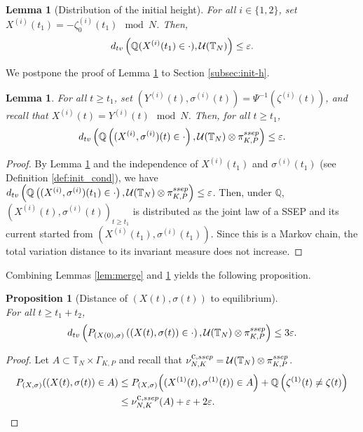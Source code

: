\documentclass[11pt,a4paper]{article}
\newcommand{\T}{\mathbb{T}}
\newcommand{\bP}{\textbf{P}}
\newcommand{\Q}{\mathbb{Q}}
\newcommand{\SSEP}{\textsc{ssep}}
\newtheorem{lemma}[theorem]{Lemma}
\newtheorem{proposition}[theorem]{Proposition}
\newcommand{\eqs}[1]{\begin{equation}#1\end{equation}}
\newcommand{\eq}[2]{\begin{equation}\label{#1}#2\end{equation}}
\begin{document}
\begin{lemma}[Distribution of the initial height] \label{lem:init_height}
For all $i \in \{1,2\}$, set $X^{(i)}(t_1) = -\zeta^{(i)}_0(t_1) \mod N$. Then,
\eq{eq:dtv_init_h}{d_{\textsc{tv}}\left(\Q(X^{(i)}(t_1) \in \cdot), \mathcal{U}(\T_N)\right) \le \varepsilon.}
\end{lemma}
We postpone the proof of Lemma \ref{lem:init_height} to Section \ref{subsec:init-h}. 

\begin{lemma} \label{lem:lawt1}
For all $t \ge t_1$, set $(Y^{(i)}(t),\sigma^{(i)}(t) ) = \Psi^{-1}\left(\zeta^{(i)}(t)\right)$, and recall that $X^{(i)}(t) = Y^{(i)}(t) \mod N$. Then, for all $t \ge t_1$,
\eqs{d_{\textsc{tv}}\left(\Q\left((X^{(i)}, \sigma^{(i)})(t) \in \cdot \right), \mathcal{U}(\T_N) \otimes \pi^{\SSEP}_{K,P}\right) \le \varepsilon.}
\end{lemma}
\begin{proof}
By Lemma \ref{lem:init_height} and the independence of $X^{(i)}(t_1)$ and $\sigma^{(i)}(t_1)$ (see Definition \ref{def:init_cond}), we have $d_{\textsc{tv}}\left(\Q\left((X^{(i)}, \sigma^{(i)})(t_1) \in \cdot\right), \mathcal{U}(\T_N) \otimes \pi_{K,P}^{\SSEP}\right) \le \varepsilon$. 
Then, under $\Q$, $(X^{(i)}(t), \sigma^{(i)}(t))_{t \ge t_1}$ is distributed as the joint law of a SSEP and its current started from $(X^{(i)}(t_1), \sigma^{(i)}(t_1))$. Since this is a Markov chain, the total variation distance to its invariant measure does not increase. 
\end{proof}

Combining Lemmas \ref{lem:merge} and \ref{lem:lawt1} yields the following proposition.
\begin{proposition}[Distance of $(X(t), \sigma(t))$ to equilibrium] \hspace{1cm}\\ For all $t\ge t_1 + t_2$, 
\eqs{d_{\textsc{tv}}\left(\textnormal{\bP}_{(X(0),\sigma)}\left((X(t), \sigma(t)) \in \cdot\right), \mathcal{U}(\T_N )\otimes \pi_{K,P}^{\SSEP}\right) \le 3\varepsilon.}
\end{proposition}
\begin{proof}
Let $A \subset \T_N \times \Gamma_{K,P}$ and recall that $\nu_{N,K}^{\hbox{\tiny c}, \SSEP} = \mathcal{U}(\T_N) \otimes \pi^{\SSEP}_{K,P}$.
 \begin{align}
 \bP_{(X,\sigma)}\!\left((X(t),\sigma(t)) \in A\right)  &\le \bP_{(X,\sigma)}\!\left((X^{(1)}(t),\sigma^{(1)}(t)) \in A\right) + \Q\left(\zeta^{(1)}(t) \neq \zeta(t)\right) \nonumber  \\
 &\le  \nu_{N,K}^{\hbox{\tiny c}, \SSEP}(A) + \varepsilon + 2 \varepsilon.
 \end{align}

\end{proof}
\end{document}
